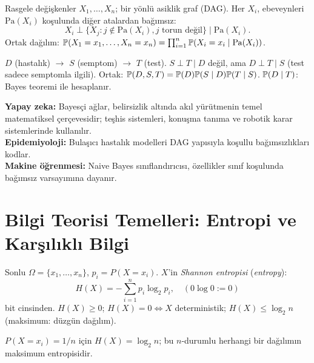 \begin{tanim}
\label{def:bayesci_ag}
Rasgele değişkenler $X_1, \ldots, X_n$; bir yönlü asiklik graf (DAG).
Her $X_i$, ebeveynleri $\mathrm{Pa}(X_i)$ koşulunda diğer atalardan bağımsız:
\[
  X_i \perp \{X_j : j \notin \mathrm{Pa}(X_i), j \text{ torun değil}\} \mid \mathrm{Pa}(X_i).
\]
Ortak dağılım: $\mathbb{P}(X_1 = x_1, \ldots, X_n = x_n) = \prod_{i=1}^n \mathbb{P}(X_i = x_i \mid \mathrm{Pa}(X_i))$.
\end{tanim}

\begin{ornek}
$D$ (hastalık) $\to$ $S$ (semptom) $\to$ $T$ (test).
$S \perp T \mid D$ değil, ama $D \perp T \mid S$ (test sadece semptomla ilgili).
Ortak: $\mathbb{P}(D, S, T) = \mathbb{P}(D)\mathbb{P}(S \mid D)\mathbb{P}(T \mid S)$.
$\mathbb{P}(D \mid T)$: Bayes teoremi ile hesaplanır.
\end{ornek}

\begin{disiplinlerarasibaglan}
\textbf{Yapay zeka:} Bayesçi ağlar, belirsizlik altında akıl yürütmenin
temel matematiksel çerçevesidir; teşhis sistemleri, konuşma tanıma ve robotik karar sistemlerinde kullanılır.\\
\textbf{Epidemiyoloji:} Bulaşıcı hastalık modelleri DAG yapısıyla koşullu bağımsızlıkları kodlar.\\
\textbf{Makine öğrenmesi:} Naive Bayes sınıflandırıcısı, özellikler sınıf koşulunda bağımsız varsayımına dayanır.
\end{disiplinlerarasibaglan}

\section{Bilgi Teorisi Temelleri: Entropi ve Karşılıklı Bilgi}
\label{sec:entropi}

\begin{tanim}\label{def:entropi}
Sonlu $\Omega=\{x_1,\ldots,x_n\}$, $p_i=P(X=x_i)$. $X$'in \emph{Shannon entropisi} (\emph{entropy}):
\[
  H(X) = -\sum_{i=1}^n p_i \log_2 p_i,\quad (0\log 0:=0)
\]
bit cinsinden. $H(X)\geq0$; $H(X)=0\iff X$ deterministik; $H(X)\leq\log_2 n$ (maksimum: düzgün dağılım).
\end{tanim}

\begin{teorem}\label{thm:maks_entropi}
$P(X=x_i)=1/n$ için $H(X)=\log_2 n$; bu $n$-durumlu herhangi bir dağılımın maksimum entropisidir.
\end{teorem}

